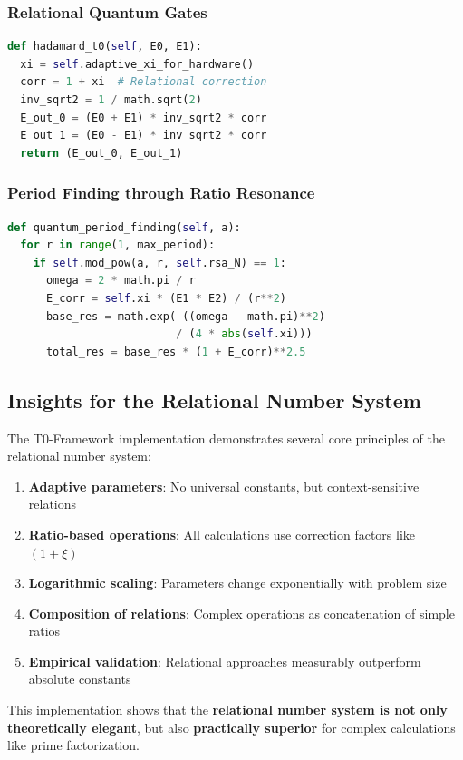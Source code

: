 	\subsubsection{Relational Quantum Gates}
	\begin{lstlisting}[language=Python,breaklines=true]
def hadamard_t0(self, E0, E1):
  xi = self.adaptive_xi_for_hardware()
  corr = 1 + xi  # Relational correction
  inv_sqrt2 = 1 / math.sqrt(2)
  E_out_0 = (E0 + E1) * inv_sqrt2 * corr
  E_out_1 = (E0 - E1) * inv_sqrt2 * corr
  return (E_out_0, E_out_1)
	\end{lstlisting}
	
	\subsubsection{Period Finding through Ratio Resonance}
	\begin{lstlisting}[language=Python,breaklines=true]
def quantum_period_finding(self, a):
  for r in range(1, max_period):
    if self.mod_pow(a, r, self.rsa_N) == 1:
      omega = 2 * math.pi / r
      E_corr = self.xi * (E1 * E2) / (r**2)
      base_res = math.exp(-((omega - math.pi)**2) 
                          / (4 * abs(self.xi)))
      total_res = base_res * (1 + E_corr)**2.5
	\end{lstlisting}
	
	\subsection{Insights for the Relational Number System}
	
	The T0-Framework implementation demonstrates several core principles of the relational number system:
	
	\begin{enumerate}
		\item \textbf{Adaptive parameters}: No universal constants, but context-sensitive relations
		\item \textbf{Ratio-based operations}: All calculations use correction factors like $(1 + \xi)$
		\item \textbf{Logarithmic scaling}: Parameters change exponentially with problem size
		\item \textbf{Composition of relations}: Complex operations as concatenation of simple ratios
		\item \textbf{Empirical validation}: Relational approaches measurably outperform absolute constants
	\end{enumerate}
	
	This implementation shows that the \textbf{relational number system is not only theoretically elegant}, but also \textbf{practically superior} for complex calculations like prime factorization.
